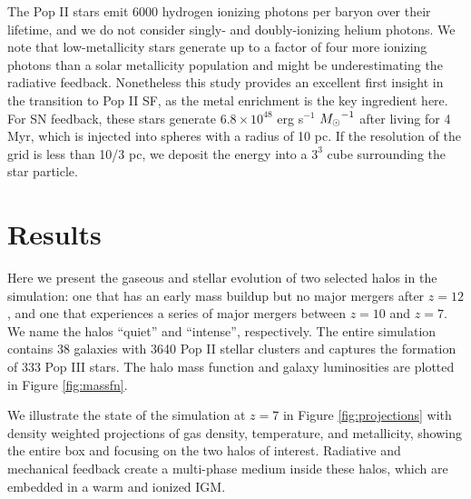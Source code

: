 \documentclass{PoS}
\begin{document}
The Pop II stars emit 6000 hydrogen ionizing photons per baryon over
their lifetime, and we do not consider singly- and doubly-ionizing
helium photons.  We note that low-metallicity stars generate up to a
factor of four more ionizing photons than a solar metallicity
population \citep{Schaerer03} and might be underestimating the
radiative feedback.  Nonetheless this study provides an excellent
first insight in the transition to Pop II SF, as the metal enrichment
is the key ingredient here.  For SN feedback, these stars generate
$6.8 \times 10^{48}$ erg s$^{-1}$ $\Ms^{-1}$ after living for 4 Myr,
which is injected into spheres with a radius of 10 pc.  If the
resolution of the grid is less than 10/3 pc, we deposit the energy
into a $3^3$ cube surrounding the star particle.

\section{Results}
\label{sec:results}

\begin{figure*}
\caption{\label{fig:evo} (a) Evolution of the total halo mass (top),
  stellar mass (middle), and gas fraction (bottom) of the quiet
  (dashed) and intense (solid) halos.  (b) Mass-weighted stellar
  metallicities and gas metallicities enriched by Pop II and Pop III
  SNe of the intense (top) and quiet (bottom) halos.}
\end{figure*}

Here we present the gaseous and stellar evolution of two selected
halos in the simulation: one that has an early mass buildup but no
major mergers after $z=12$, and one that experiences a series of major
mergers between $z=10$ and $z=7$.  We name the halos ``quiet'' and
``intense'', respectively.  The entire simulation contains 38 galaxies
with 3640 Pop II stellar clusters and captures the formation of 333
Pop III stars.  The halo mass function and galaxy luminosities are
plotted in Figure \ref{fig:massfn}.


We illustrate the state of the simulation at $z=7$ in Figure
\ref{fig:projections} with density weighted projections of gas
density, temperature, and metallicity, showing the entire box and
focusing on the two halos of interest.  Radiative and mechanical
feedback create a multi-phase medium inside these halos, which are
embedded in a warm and ionized IGM.
\end{document}
